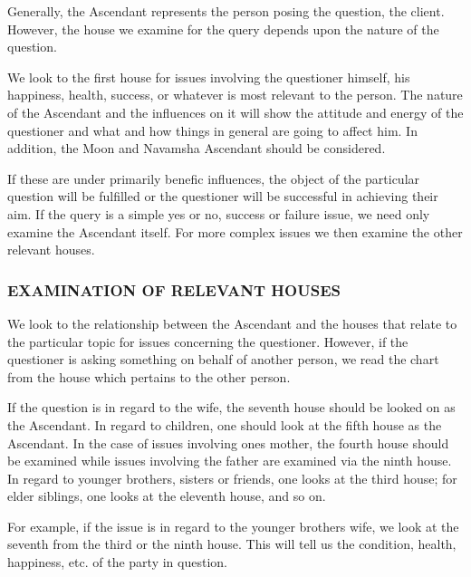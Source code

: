  


 

Generally, the Ascendant represents the person posing the question, the client. However, the house we examine for the query depends upon the nature of the question.

 

We look to the first house for issues involving the questioner himself, his happiness, health, success, or whatever is most relevant to the person. The nature of the Ascendant and the influences on it will show the attitude and energy of the questioner and what and how things in general are going to affect him. In addition, the Moon and Navamsha Ascendant should be considered.

 

If these are under primarily benefic influences, the object of the particular question will be fulfilled or the questioner will be successful in achieving their aim. If the query is a simple yes or no, success or failure issue, we need only examine the Ascendant itself. For more complex issues we then examine the other relevant houses.

 

\subsubsection{EXAMINATION OF RELEVANT HOUSES}

 

We look to the relationship between the Ascendant and the houses that relate to the particular topic for issues concerning the questioner. However, if the questioner is asking something on behalf of another person, we read the chart from the house which pertains to the other person.

 

If the question is in regard to the wife, the seventh house should be looked on as the Ascendant. In regard to children, one should look at the fifth house as the Ascendant. In the case of issues involving ones mother, the fourth house should be examined while issues involving the father are examined via the ninth house. In regard to younger brothers, sisters or friends, one looks at the third house; for elder siblings, one looks at the eleventh house, and so on.

 

For example, if the issue is in regard to the younger brothers wife, we look at the seventh from the third or the ninth house. This will tell us the condition, health, happiness, etc. of the party in question.

